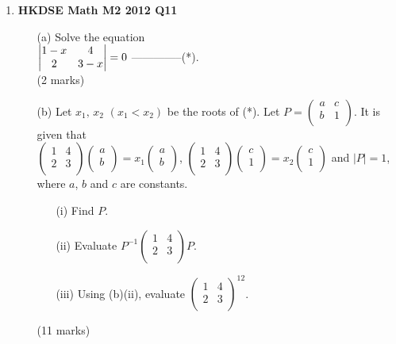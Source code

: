 \documentclass{report}
\begin{document}
\begin{enumerate}
	\item \textbf{HKDSE Math M2 2012 Q11}
	\begin{enumerate}
		\item [(a)]Solve the equation \\$\begin{vmatrix}
			1-x & 4  \\ 
			2 & 3-x  \notag
		\end{vmatrix} = 0 $ --------------(*). \\(2 marks)
		\item [(b)]Let $x_1 ,\, x_2  $ $(x_1<x_2)$ be the roots of (*). Let $P = \begin{pmatrix}
			a&c\\b&1\\
		\end{pmatrix}$. It is given that \\
		$\begin{pmatrix}1&4\\2&3\\\end{pmatrix}\begin{pmatrix}a\\b\\\end{pmatrix} = x_1 \begin{pmatrix}a\\b\\\end{pmatrix}$, $\begin{pmatrix}1&4\\2&3\\\end{pmatrix}\begin{pmatrix}c\\1\\\end{pmatrix} = x_2 \begin{pmatrix}c\\1\\\end{pmatrix}$ and $|P| =1$,\\
		where $a$, $b$ and $c$ are constants.
		\begin{enumerate}
			\item [(i)]Find $P$.
			\item [(ii)]Evaluate $P^{-1}\begin{pmatrix}1&4\\2&3\\\end{pmatrix}P$.
			\item [(iii)]Using (b)(ii), evaluate $\begin{pmatrix}1&4\\2&3\\\end{pmatrix}^{12}$.
		\end{enumerate}
		(11 marks)
	\end{enumerate}


\end{enumerate}
\end{document}
